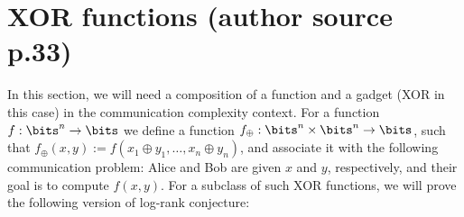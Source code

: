 \section*{XOR functions (author source p.33)}
In this section, we will need a composition of a function and a gadget (XOR in this case) in the communication complexity context. For a function $f:\bits^n\to\bits$ we define a function $f_\oplus:\bits^n\times\bits^n\to\bits$, such that $f_\oplus(x,y):=f(x_1\oplus y_1,\ldots,x_n\oplus y_n)$, and associate it with the following communication problem: Alice and Bob are given $x$ and $y$, respectively, and their goal is to compute $f(x,y)$. For a subclass of such XOR functions, we will prove the following version of log-rank conjecture:
